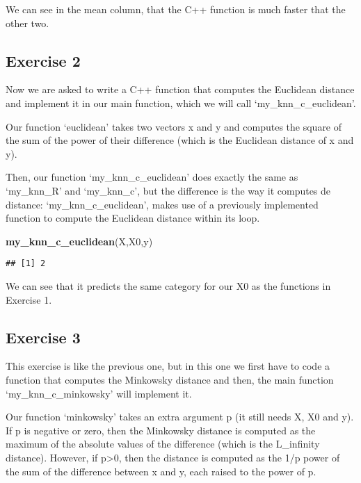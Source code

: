 \documentclass[
]{article}
\newenvironment{Shaded}{\begin{snugshade}}{\end{snugshade}}
\newcommand{\FunctionTok}[1]{\textcolor[rgb]{0.13,0.29,0.53}{\textbf{#1}}}
\newcommand{\NormalTok}[1]{#1}
\begin{document}
We can see in the mean column, that the C++ function is much faster that
the other two.

\hypertarget{exercise-2}{%
\subsection{Exercise 2}\label{exercise-2}}

Now we are asked to write a C++ function that computes the Euclidean
distance and implement it in our main function, which we will call
`my\_knn\_c\_euclidean'.

Our function `euclidean' takes two vectors x and y and computes the
square of the sum of the power of their difference (which is the
Euclidean distance of x and y).

Then, our function `my\_knn\_c\_euclidean' does exactly the same as
`my\_knn\_R' and `my\_knn\_c', but the difference is the way it computes
de distance: `my\_knn\_c\_euclidean', makes use of a previously
implemented function to compute the Euclidean distance within its loop.

\begin{Shaded}
\begin{Highlighting}[]
\FunctionTok{my\_knn\_c\_euclidean}\NormalTok{(X,X0,y)}
\end{Highlighting}
\end{Shaded}

\begin{verbatim}
## [1] 2
\end{verbatim}

We can see that it predicts the same category for our X0 as the
functions in Exercise 1.

\hypertarget{exercise-3}{%
\subsection{Exercise 3}\label{exercise-3}}

This exercise is like the previous one, but in this one we first have to
code a function that computes the Minkowsky distance and then, the main
function `my\_knn\_c\_minkowsky' will implement it.

Our function `minkowsky' takes an extra argument p (it still needs X, X0
and y). If p is negative or zero, then the Minkowsky distance is
computed as the maximum of the absolute values of the difference (which
is the L\_infinity distance). However, if p\textgreater0, then the
distance is computed as the 1/p power of the sum of the difference
between x and y, each raised to the power of p.
\end{document}
